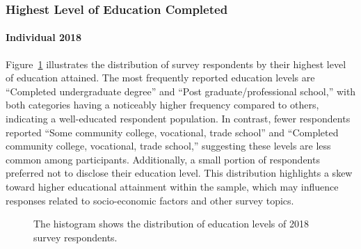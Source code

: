 \documentclass[
  letterpaper,
  DIV=11,
  numbers=noendperiod]{scrartcl}
\let\oldparagraph\paragraph
\renewcommand{\paragraph}[1]{\oldparagraph{#1}\mbox{}}
\begin{document}
\subsubsection{Highest Level of Education
Completed}\label{highest-level-of-education-completed}

\paragraph{Individual 2018}\label{individual-2018-1}

Figure~\ref{fig-three} illustrates the distribution of survey
respondents by their highest level of education attained. The most
frequently reported education levels are ``Completed undergraduate
degree'' and ``Post graduate/professional school,'' with both categories
having a noticeably higher frequency compared to others, indicating a
well-educated respondent population. In contrast, fewer respondents
reported ``Some community college, vocational, trade school'' and
``Completed community college, vocational, trade school,'' suggesting
these levels are less common among participants. Additionally, a small
portion of respondents preferred not to disclose their education level.
This distribution highlights a skew toward higher educational attainment
within the sample, which may influence responses related to
socio-economic factors and other survey topics.

\begin{figure}


\caption{\label{fig-three}The histogram shows the distribution of
education levels of 2018 survey respondents.}

\end{figure}%
\end{document}
